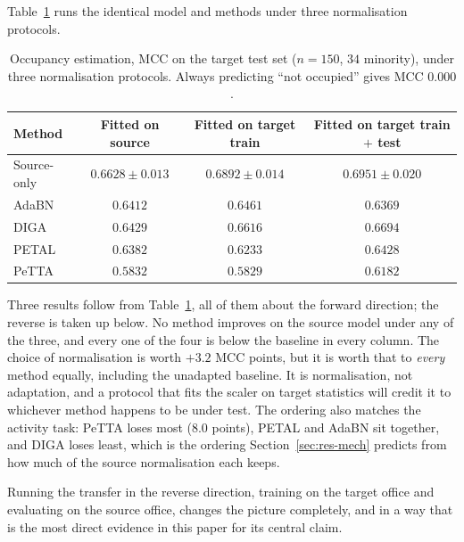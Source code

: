 \documentclass[a4paper,fleqn]{cas-dc}
\begin{document}
Table~\ref{tab:oe} runs the identical model and methods under three normalisation
protocols.

\begin{table}[t]
\centering
\caption{Occupancy estimation, MCC on the target test set ($n=150$, $34$ minority), under
three normalisation protocols. Always predicting ``not occupied'' gives MCC $0.000$.}
\label{tab:oe}
\begin{tabular}{lccc}
\toprule
Method & Fitted on source & Fitted on target train & Fitted on target train $+$ test \\
\midrule
Source-only & $\mathbf{0.6628}\pm0.013$ & $\mathbf{0.6892}\pm0.014$ & $\mathbf{0.6951}\pm0.020$ \\
AdaBN       & $0.6412$ & $0.6461$ & $0.6369$ \\
DIGA        & $0.6429$ & $0.6616$ & $0.6694$ \\
PETAL       & $0.6382$ & $0.6233$ & $0.6428$ \\
PeTTA       & $0.5832$ & $0.5829$ & $0.6182$ \\
\bottomrule
\end{tabular}
\end{table}

Three results follow from Table~\ref{tab:oe}, all of them about the forward direction;
the reverse is taken up below. No method improves on the source model under any of the
three, and every one of the four is below the baseline in every column. The choice of
normalisation is worth $+3.2$ MCC points, but it is worth that to \emph{every} method
equally, including the unadapted baseline. It is normalisation, not adaptation, and a
protocol that fits the scaler on target statistics will credit it to whichever method
happens to be under test. The ordering also matches the activity task: PeTTA loses most
($8.0$ points), PETAL and AdaBN sit together, and DIGA loses least, which is the ordering
Section~\ref{sec:res-mech} predicts from how much of the source normalisation each keeps.

Running the transfer in the reverse direction, training on the target office and
evaluating on the source office, changes the picture completely, and in a way that is
the most direct evidence in this paper for its central claim.
\end{document}
